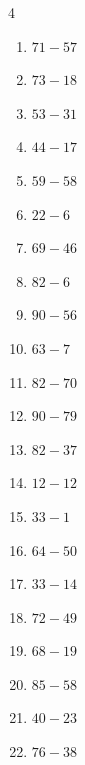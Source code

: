 \begin{multicols}{4}
\begin{enumerate}
  \item $71-57$
        \phantom{$=14$}

  \item $73-18$
        \phantom{$=55$}

  \item $53-31$
        \phantom{$=22$}

  \item $44-17$
        \phantom{$=27$}

  \item $59-58$
        \phantom{$=1$}

  \item $22-6$
        \phantom{$=16$}

  \item $69-46$
        \phantom{$=23$}

  \item $82-6$
        \phantom{$=76$}

  \item $90-56$
        \phantom{$=34$}

  \item $63-7$
        \phantom{$=56$}

  \item $82-70$
        \phantom{$=12$}

  \item $90-79$
        \phantom{$=11$}

  \item $82-37$
        \phantom{$=45$}

  \item $12-12$
        \phantom{$=0$}

  \item $33-1$
        \phantom{$=32$}

  \item $64-50$
        \phantom{$=14$}

\columnbreak %

  \item $33-14$
        \phantom{$=19$}

  \item $72-49$
        \phantom{$=23$}

  \item $68-19$
        \phantom{$=49$}

  \item $85-58$
        \phantom{$=27$}

  \item $40-23$
        \phantom{$=17$}

  \item $76-38$
        \phantom{$=38$}


\end{enumerate}
\end{multicols}

